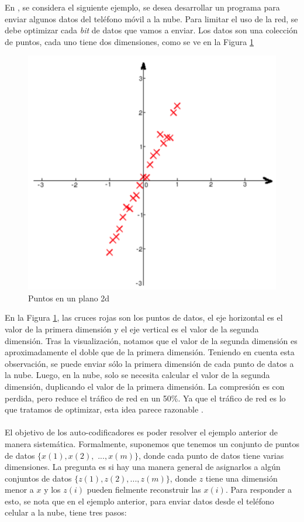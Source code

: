     En \cite{Le15atutorial}, se considera el siguiente ejemplo, se desea desarrollar un programa para enviar algunos datos del teléfono móvil a la nube. Para limitar el uso de la red, se debe optimizar cada \textit{bit} de datos que vamos a enviar. Los datos son una colección de puntos, cada uno tiene dos dimensiones, como se ve en la Figura \ref{fig:aenco1}
    \begin{figure}[htp]
        \centering
        \includegraphics[scale=0.37]{chapter3/aenco1.png}
        \caption{Puntos en un plano 2d}
        \label{fig:aenco1}
    \end{figure}

    En la Figura \ref{fig:aenco1}, las cruces rojas son los puntos de datos, el eje horizontal es el valor de la primera dimensión y el eje vertical es el valor de la segunda dimensión. Tras la visualización, notamos que el valor de la segunda dimensión es aproximadamente el doble que de la primera dimensión. Teniendo en cuenta esta observación, se puede enviar sólo la primera dimensión de cada punto de datos a la nube. Luego, en la nube, solo se necesita calcular el valor de la segunda dimensión, duplicando el valor de la primera dimensión. La compresión es con perdida, pero reduce el tráfico de red en un 50\%. Ya que el tráfico de red es lo que tratamos de optimizar, esta idea parece razonable \cite{Le15atutorial}.
    \\\\
    El objetivo de los auto-codificadores es poder resolver el ejemplo anterior de manera sistemática. Formalmente, suponemos que tenemos un conjunto de puntos de datos $\{x(1), x(2),$ $..., x(m)\}$, donde cada punto de datos tiene varias dimensiones. La pregunta es si hay una manera general de asignarlos a algún conjuntos de datos $\{z(1), z(2), ..., z(m)\}$, donde $z$ tiene una dimensión menor a $x$ y los $z(i)$ pueden fielmente reconstruir las $x(i)$. Para responder a esto, se nota que en el ejemplo anterior, para enviar datos desde el teléfono celular a la nube, tiene tres pasos:

